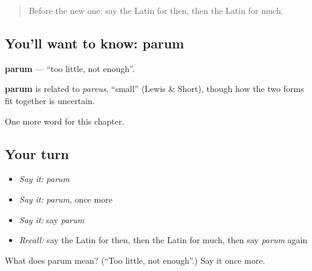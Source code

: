 \begin{quote}
Before the new one: say the Latin for then, then the Latin for much.
\end{quote}

\subsection*{You'll want to know: parum}
\textbf{parum} — \textquotedblleft{}too little, not enough\textquotedblright{}.

\begin{cousinweb}
\textbf{parum} is related to \emph{parvus}, \textquotedblleft{}small\textquotedblright{} (Lewis \& Short), though how the two forms fit together is uncertain.
\end{cousinweb}

\begin{grammarlens}[title={What you've built}]
One more word for this chapter.
\end{grammarlens}

\subsection*{Your turn}
\begin{itemize}
\raggedright
  \item \emph{Say it:} \emph{parum}
  \item \emph{Say it:} \emph{parum}, once more
  \item \emph{Say it:} say \emph{parum}
  \item \emph{Recall:} say the Latin for then, then the Latin for much, then say \emph{parum} again
\end{itemize}

\begin{tcolorbox}[breakable,colback=teal!4,colframe=teal!35!black,title={Before you move on}]
What does parum mean? (\textquotedblleft{}Too little, not enough\textquotedblright{}.) Say it once more.
\end{tcolorbox}
